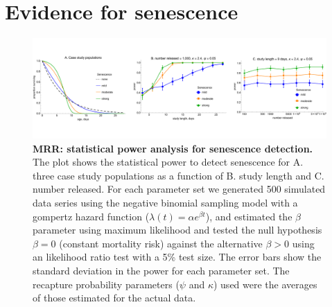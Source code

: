 \documentclass[12pt]{article}
\begin{document}
\section{Evidence for senescence}


\begin{figure}[ht]
	\centerline{\includegraphics[width=1.25\textwidth]{./Figure_files/mrr_mcPowerAnalysis_senescence.pdf}}
	\caption{\textbf{MRR: statistical power analysis for senescence detection.} The plot shows the statistical power to detect senescence for A. three case study populations as a function of B. study length and C. number released. For each parameter set we generated 500 simulated data series using the negative binomial sampling model with a gompertz hazard function ($\lambda(t) = \alpha e^{\beta t}$), and estimated the $\beta$ parameter using maximum likelihood and tested the null hypothesis $\beta=0$ (constant mortality risk) against the alternative $\beta>0$ using an likelihood ratio test with a 5\% test size. The error bars show the standard deviation in the power for each parameter set. The recapture probability parameters ($\psi$ and $\kappa$) used were the averages of those estimated for the actual data.}
	\label{fig:mrr_mcPowerAnalysis_senescence}
\end{figure}
\end{document}
